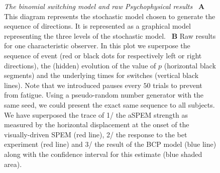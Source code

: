 \documentclass[profile,final,english, draft]{article}%
\begin{document}
\begin{figure}%
\caption{%
\emph{The binomial switching model and raw Psychophysical results}%
~\textbf{A}
This diagram represents the stochastic model chosen
to generate the sequence of directions.
It is represented as a graphical model representing
the three levels of the stochastic model. %
~\textbf{B}
%
%
%
%
%
Raw results for one characteristic observer.
In this plot we superpose the sequence of event
(red or black dots for respectively left or right directions),
the (hidden) evolution of the value of $p$ (horizontal black segments)
and the underlying times for switches (vertical black lines).
Note that we introduced pauses every  $50$ trials to prevent from fatigue.
Using a pseudo-random number generator with the same seed,
we could present the exact same sequence to all subjects. %
We have superposed the trace of
1/ the aSPEM strength as measured by the horizontal displacement
at the onset of the visually-driven SPEM (red line),
2/ the response to the bet experiment (red line) and
3/ the result of the BCP model (blue line)
along with the confidence interval for this estimate (blue shaded area).
}
\label{fig:results_raw}
\end{figure}
\end{document}

